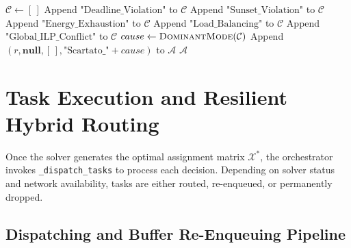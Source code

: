 \begin{algorithm}[htbp]
\begin{algorithmic}[1]
            \State $\mathcal{C} \gets [\,]$
                    \State Append $\text{"Deadline\_Violation"}$ to $\mathcal{C}$
                    \State Append $\text{"Sunset\_Violation"}$ to $\mathcal{C}$
                    \State Append $\text{"Energy\_Exhaustion"}$ to $\mathcal{C}$
                    \State Append $\text{"Load\_Balancing"}$ to $\mathcal{C}$
                \Else
                    \State Append $\text{"Global\_ILP\_Conflict"}$ to $\mathcal{C}$
                \EndIf
            \EndFor
            \State $cause \gets \Call{DominantMode}{\mathcal{C}}$
        \EndIf
        \State Append $(r, \mathbf{null}, [\,], \text{"Scartato\_"} + cause)$ to $\mathcal{A}$
    \EndIf
\EndFor
\State \Return $\mathcal{A}$
\end{algorithmic}
\end{algorithm}
\FloatBarrier

\section{Task Execution and Resilient Hybrid Routing}
\label{sec:task_execution_routing}

Once the solver generates the optimal assignment matrix $\mathcal{X}^*$, the orchestrator invokes \texttt{\_dispatch\_tasks} to process each decision. 
Depending on solver status and network availability, tasks are either routed, re-enqueued, or permanently dropped.

\subsection{Dispatching and Buffer Re-Enqueuing Pipeline}
\label{subsec:dispatching_pipeline}

